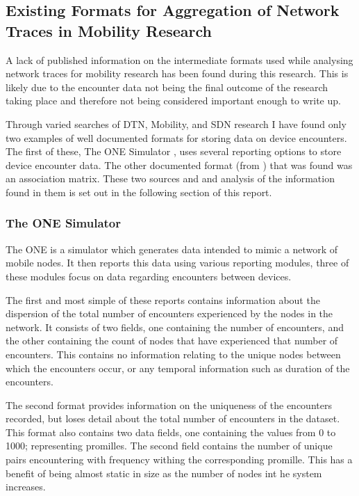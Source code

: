 \subsection{Existing Formats for Aggregation of Network Traces in Mobility Research}

A lack of published information on the intermediate formats used while analysing network traces for mobility research has been found during this research. This is likely due to the encounter data not being the final outcome of the research taking place and therefore not being considered important enough to write up.

Through varied searches of DTN, Mobility, and SDN research I have found only two examples of well documented formats for storing data on device encounters. The first of these, The ONE Simulator \cite{Keranen2009}, uses several reporting options to store device encounter data. The other documented format (from \cite{Thakur2012}) that was found was an association matrix. These two sources and and analysis of the information found in them is set out in the following section of this report.

\subsubsection{The ONE Simulator \cite{Keranen2009}}
The ONE is a simulator which generates data intended to mimic a network of mobile nodes. It then reports this data using various reporting modules, three of these modules focus on data regarding encounters between devices.

The first and most simple of these reports contains information about the dispersion of the total number of encounters experienced by the nodes in the network. It consists of two fields, one containing the number of encounters, and the other containing the count of nodes that have experienced that number of encounters. This contains no information relating to the unique nodes between which the encounters occur, or any temporal information such as duration of the encounters. 

The second format provides information on the uniqueness of the encounters recorded, but loses detail about the total number of encounters in the dataset. This format also contains two data fields, one containing the values from 0 to 1000; representing promilles. The second field contains the number of unique pairs encountering with frequency withing the corresponding promille. This has a benefit of being almost static in size as the number of nodes int he system increases. 

